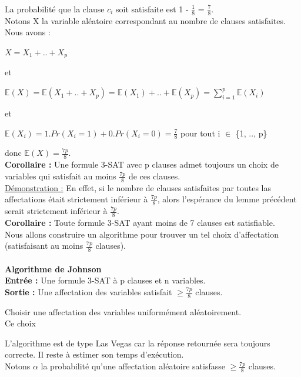 \documentclass[12pt,a4paper]{article}
\begin{document}
La probabilité que la clause $c_i$ soit satisfaite est 1 - $\frac{1}{8}$ = $\frac{7}{8}$.\\
Notons X la variable aléatoire correspondant au nombre de clauses satisfaites. Nous avons :
\begin{center}
	$X = X_1 + .. + X_p$
\end{center}
et
\begin{center}
	$\mathbb{E}(X) = \mathbb{E}(X_1 + .. + X_p) = \mathbb{E}(X_1) + .. + \mathbb{E}(X_p) = \sum\limits_{i = 1}^{p}\mathbb{E}(X_i)$
\end{center}
et
\begin{center}
	$\mathbb{E}(X_i) = 1.Pr(X_i = 1) + 0.Pr(X_i = 0) = \frac{7}{8}$ pour tout i $\in$ \{1, .., p\}
\end{center}
donc $\mathbb{E}(X) = \frac{7p}{8}$.\\
\textbf{Corollaire :} Une formule 3-SAT avec p clauses admet toujours un choix de variables qui satisfait au moins $\frac{7p}{8}$ de ces clauses.\\
\underline{Démonstration :} En effet, si le nombre de clauses satisfaites par toutes las affectations était strictement inférieur à $\frac{7p}{8}$, alors l'espérance du lemme précédent serait strictement inférieur à $\frac{7p}{8}$.\\
\textbf{Corollaire :} Toute formule 3-SAT ayant moins de 7 clauses est satisfiable.\\
Nous allons construire un algorithme pour trouver un tel choix d'affectation (satisfaisant au moins $\frac{7p}{8}$ clauses).\\\\
\textbf{\large Algorithme de Johnson}\\
\textbf{Entrée :} Une formule 3-SAT à p clauses et n variables.\\
\textbf{Sortie :} Une affectation des variables satisfait $\geq \frac{7p}{8}$ clauses.\\
\begin{algorithm}[H]
	Choisir une affectation des variables uniformément aléatoirement.\\
	\Return Ce choix
\end{algorithm}
L'algorithme est de type Las Vegas car la réponse retournée sera toujours correcte. Il reste à estimer son temps d'exécution.\\
Notons $\alpha$ la probabilité qu'une affectation aléatoire satisfasse $\geq \frac{7p}{8}$ clauses.\\
\end{document}
